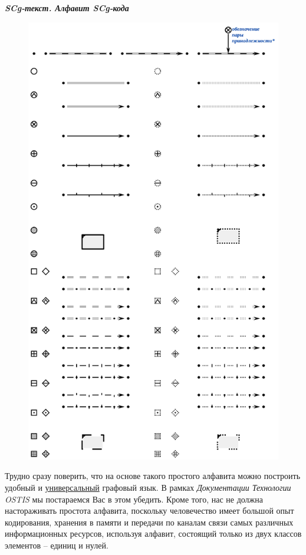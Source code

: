 \textbf{\textit{SCg-текст. Алфавит SCg-кода}}


\begin{figure}[h]
	\centering
	\includegraphics[scale=0.8]{images/intro/scg/SCg-full.png}
\end{figure}


\bigskip
Трудно сразу поверить, что на основе такого простого алфавита можно построить удобный и \uline{универсальный} графовый язык. В рамках \textit{Документации Технологии OSTIS} мы постараемся Вас в этом убедить. Кроме того, нас не должна настораживать простота алфавита, поскольку человечество имеет большой опыт кодирования, хранения в памяти и передачи по каналам связи самых различных информационных ресурсов, используя алфавит, состоящий только из двух классов элементов -- единиц и нулей. 

